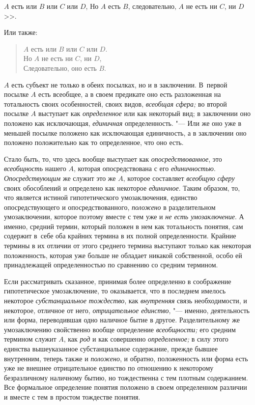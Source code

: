 $A$ есть или $B$ или $C$ или $D$,
Но $A$ есть $B$, следовательно, $A$ не есть ни $C$, ни $D$>>.

Или также:

\begin{verse}
$A$ есть или $B$ или $C$ или $D$.\\
Но $A$ не есть ни $C$, ни $D$,\\
Следовательно, оно есть $B$.
\end{verse}

$A$ есть субъект не только в обеих посылках, но и в заключении.
В~первой посылке $A$ есть всеобщее, а
в своем предикате оно есть разложенная на тотальность своих особенностей,
своих видов, {\em всеобщая сфера;} во второй посылке $A$
выступает как {\em определенное} или
как некоторый вид; в заключении оно положено как исключающая, {\em единичная}
определенность. "--- Или же оно уже в меньшей
посылке положено как исключающая единичность, а в заключении оно положено
положительно как то определенное, что оно есть.

Стало быть, то, что здесь вообще выступает как {\em опосредствованное},
это {\em всеобщность} нашего $A$, которая опосредствована с его
{\em единичностью}. {\em Опосредствующим} же служит это же $A$,
которое составляет {\em всеобщую сферу}
своих обособлений и определено как некоторое {\em единичное}. Таким
образом, то, что является истиной гипотетического умозаключения, единство
опосредствующего и опосредствованного, {\em положено} в
разделительном умозаключении, которое поэтому вместе с тем уже и
{\em не есть умозаключение}.
А именно, средний термин, который положен в нем как
тотальность понятия, сам содержит в~себе оба крайних термина в их полной
определенности. Крайние термины в их отличии от этого среднего термина
выступают только как некоторая положенность, которая уже больше не обладает
никакой собственной, особо ей принадлежащей определенностью по сравнению со
средним термином.

Если рассматривать сказанное, принимая более определенно в
соображение гипотетическое умозаключение, то оказывается, что в последнем
имелось некоторое {\em субстанциальное тождество}, как {\em внутренняя} связь
необходимости, и некоторое, отличное от него,
{\em отрицательное единство}, "---
именно, деятельность или форма, переводившая одно наличное
бытие в другое. Разделительному же умозаключению свойственно вообще
определение {\em всеобщности;} его средним термином служит $A$,
как {\em род} и как совершенно {\em определенное;} в
силу этого единства вышеуказанное субстанциальное содержание, прежде бывшее
внутренним, теперь также и {\em положено}, и
обратно, положенность или форма есть уже не внешнее отрицательное единство
по отношению к некоторому безразличному наличному бытию, но тождественна с
тем плотным содержанием. Все формальное определение понятия положено в
своем определенном различии и вместе с тем в простом тождестве понятия.

